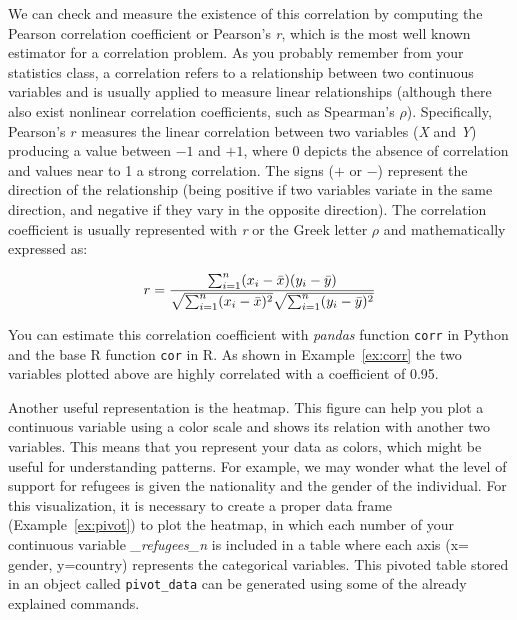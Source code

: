 We can check and measure the existence of this correlation by computing the Pearson correlation coefficient or Pearson's \emph{r}, which is the most well known estimator for a correlation problem. As you probably remember from your statistics class, a correlation refers to a relationship between two continuous variables and is usually applied to measure linear relationships (although there  also exist nonlinear correlation coefficients, such as Spearman's $\rho$). Specifically, Pearson's $r$  measures the linear correlation between two variables (\emph{X} and \emph{Y}) producing a value between $-1$ and $+1$, where 0 depicts the absence of correlation and values near to 1 a strong correlation. The signs ($+$ or $-$) represent the direction of the relationship (being positive if two variables variate in the same direction, and negative if they vary in the opposite direction). The correlation coefficient is usually represented with \emph{r} or the Greek letter $\rho$ and mathematically expressed as:

$$
  r =
  \frac{ \sum_{i=1}^{n}(x_i-\bar{x})(y_i-\bar{y}) }{%
        \sqrt{\sum_{i=1}^{n}(x_i-\bar{x})^2}\sqrt{\sum_{i=1}^{n}(y_i-\bar{y})^2}}
$$

You can estimate this correlation coefficient with \emph{pandas} function \texttt{corr} in Python and the base R function \texttt{cor} in R. As shown in Example~\ref{ex:corr} the two variables plotted above are highly correlated with a coefficient of 0.95.


Another useful representation is the heatmap. This figure can help you plot a continuous variable using a color scale and shows its relation with another two variables.  This means that you represent your data as colors, which might be useful for understanding patterns. For example, we may wonder what  the level of support for refugees is given the nationality and the gender of the individual. For this visualization, it is necessary to create a proper data frame (Example~\ref{ex:pivot}) to plot the heatmap, in which each number of your continuous variable \emph{\_refugees\_n} is included in a table where each axis (x= gender, y=country) represents the categorical variables. This pivoted table stored in an object called \texttt{pivot\_data} can be generated using some of the already explained commands.


